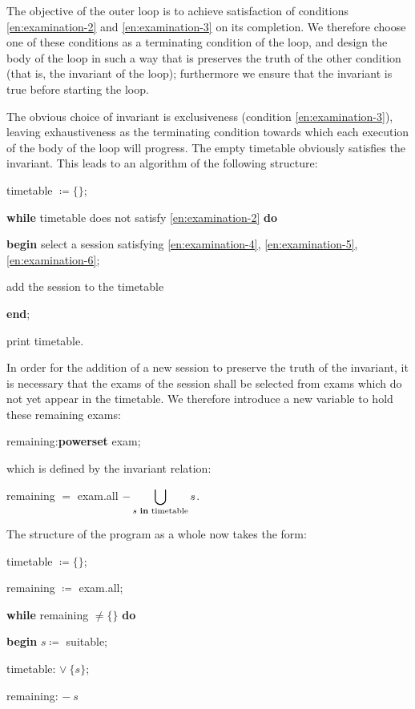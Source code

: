 \documentclass[twoside,11pt]{book}
\begin{document}
The objective of the outer loop is to achieve satisfaction of conditions \ref{en:examination-2} and \ref{en:examination-3} on its completion. We therefore choose one of these conditions as a terminating condition of the loop, and design the body of the loop in such a way that is preserves the truth of the other condition (that is, the invariant of the loop); furthermore we ensure that the invariant is true before starting the loop.

The obvious choice of invariant is exclusiveness (condition \ref{en:examination-3}), leaving exhaustiveness as the terminating condition towards which each execution of the body of the loop will progress. The empty timetable obviously satisfies the invariant. This leads to an algorithm of the following structure:

\quad timetable $\coloneq \{\}$;

\quad \textbf{while} timetable does not satisfy \ref{en:examination-2} \textbf{do}

\quad \textbf{begin} select a session satisfying \ref{en:examination-4}, \ref{en:examination-5}, \ref{en:examination-6};

\quad \quad add the session to the timetable

\quad \textbf{end};

\quad print timetable.

In order for the addition of a new session to preserve the truth of the
invariant, it is necessary that the exams of the session shall be selected from
exams which do not yet appear in the timetable. We therefore introduce a
new variable to hold these remaining exams:

\quad remaining:\textbf{powerset} exam;

\noindent
which is defined by the invariant relation:

\quad remaining $=$ exam.all $- \displaystyle\bigcup_{s \text{ \textbf{in} timetable}} s$.

\noindent
The structure of the program as a whole now takes the form:

\quad timetable $\coloneq \{\}$;

\quad remaining $\coloneq$ exam.all;

\quad \textbf{while} remaining $\neq \{\}$ \textbf{do}

\quad \quad \textbf{begin} $s\coloneq$ suitable;

\quad \quad \quad timetable: $\vee\ \{s\}$;

\quad \quad \quad remaining: $-\ s$
\end{document}

